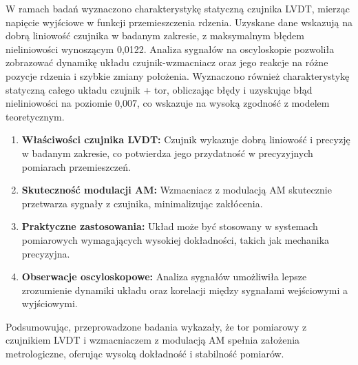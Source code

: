 \documentclass{article}
\begin{document}
W ramach badań wyznaczono charakterystykę statyczną czujnika LVDT, mierząc napięcie wyjściowe w funkcji przemieszczenia rdzenia. Uzyskane dane wskazują na dobrą liniowość czujnika w badanym zakresie, z maksymalnym błędem nieliniowości wynoszącym 0,0122. Analiza sygnałów na oscyloskopie pozwoliła zobrazować dynamikę układu czujnik-wzmacniacz oraz jego reakcje na różne pozycje rdzenia i szybkie zmiany położenia. Wyznaczono również charakterystykę statyczną całego układu czujnik + tor, obliczając błędy i uzyskując błąd nieliniowości na poziomie 0,007, co wskazuje na wysoką zgodność z modelem teoretycznym.
\begin{enumerate}
    \item \textbf{Właściwości czujnika LVDT:} Czujnik wykazuje dobrą liniowość i precyzję w badanym zakresie, co potwierdza jego przydatność w precyzyjnych pomiarach przemieszczeń.
    \item \textbf{Skuteczność modulacji AM:} Wzmacniacz z modulacją AM skutecznie przetwarza sygnały z czujnika, minimalizując zakłócenia.
    \item \textbf{Praktyczne zastosowania:} Układ może być stosowany w systemach pomiarowych wymagających wysokiej dokładności, takich jak mechanika precyzyjna.
    \item \textbf{Obserwacje oscyloskopowe:} Analiza sygnałów umożliwiła lepsze zrozumienie dynamiki układu oraz korelacji między sygnałami wejściowymi a wyjściowymi.
\end{enumerate}
Podsumowując, przeprowadzone badania wykazały, że tor pomiarowy z czujnikiem LVDT i wzmacniaczem z modulacją AM spełnia założenia metrologiczne, oferując wysoką dokładność i stabilność pomiarów.
\end{document}
